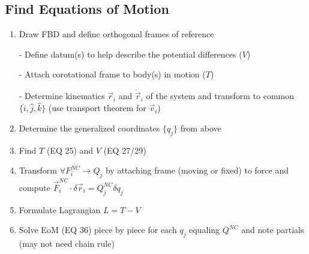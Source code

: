 \documentclass[conference]{IEEEtran}
\begin{document}
\subsection{Find Equations of Motion}
\begin{enumerate}
    \item Draw FBD and define orthogonal frames of reference
    
    - Define datum(s) to help describe the potential differences ($V$)
    
    - Attach corotational frame to body(s) in motion ($T$)
   
    - Determine kinematics $\vec{r}_i$ and $\dot{\vec{r}}_i$ of the system and transform to common $\{\hat{i}, \hat{j}, \hat{k}\}$ (use transport theorem for $\vec{v}_i$)
    \item Determine the generalized coordinates $\{q_j\}$ from above
    \item Find $T$ (EQ 25) and $V$ (EQ 27/29)
    \item Transform $\forall F_i^{NC} \to Q_j$ by attaching frame (moving or fixed) to force and compute $\vec{F}_i^{NC} \cdot \delta \vec{r}_i = Q_j^{NC} \delta q_j$
    \item Formulate Lagrangian $L = T - V$
    \item Solve EoM (EQ 36) piece by piece for each $q_j$ equaling $Q^{NC}$ and note partials (may not need chain rule)
\end{enumerate}
\end{document}
